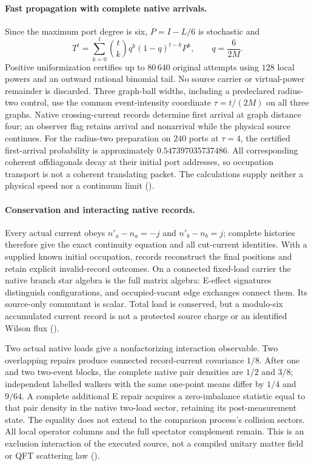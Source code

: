 \paragraph{Fast propagation with complete native arrivals.}
Since the maximum port degree is six, $P=I-L/6$ is stochastic and
\[
 T^t=\sum_{k=0}^{t}\binom tk q^k(1-q)^{t-k}P^k,
 \qquad q=\frac6{2M}.
\]
Positive uniformization certifies up to $80\,640$ original attempts using
$128$ local powers and an outward rational binomial tail. No source
carrier or virtual-power remainder is discarded. Three graph-ball widths,
including a predeclared radius-two control, use the common event-intensity
coordinate $\tau=t/(2M)$ on all three graphs. Native crossing-current
records determine first arrival at graph distance four; an observer flag
retains arrival and nonarrival while the physical source continues.
For the radius-two preparation on $240$ ports at $\tau=4$, the certified
first-arrival probability is approximately $0.547397035737486$.
All corresponding coherent offdiagonals decay at their initial port
addresses, so occupation transport is not a coherent translating packet.
The calculations supply neither a physical speed nor a continuum limit
().

\paragraph{Conservation and interacting native records.}
Every actual current obeys $n'_a-n_a=-j$ and $n'_b-n_b=j$; complete
histories therefore give the exact continuity equation and all cut-current
identities. With a supplied known initial occupation, records reconstruct
the final positions and retain explicit invalid-record outcomes. On a
connected fixed-load carrier the native branch star algebra is the full
matrix algebra: E-effect signatures distinguish configurations, and
occupied-vacant edge exchanges connect them. Its source-only commutant is
scalar. Total load is conserved, but a modulo-six accumulated current
record is not a protected source charge or an identified Wilson flux
().

Two actual native loads give a nonfactorizing interaction observable.
Two overlapping repairs produce connected record-current covariance
$1/8$. After one and two two-event blocks, the complete native pair
densities are $1/2$ and $3/8$; independent labelled walkers with the same
one-point means differ by $1/4$ and $9/64$. A complete additional E repair
acquires a zero-imbalance statistic equal to that pair density in the
native two-load sector, retaining its post-measurement state. The equality
does not extend to the comparison process's collision sectors. All local
operator columns and the full spectator complement remain. This is an
exclusion interaction of the executed source, not a compiled unitary
matter field or QFT scattering law
().

